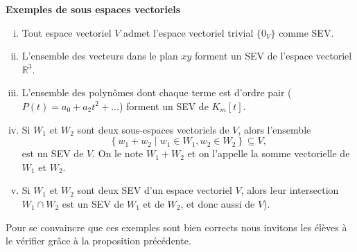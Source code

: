 \documentclass[oneside,12pt,french,table]{book}
\theoremstyle{definition}
\theoremstyle{definition}
\theoremstyle{definition}
\begin{document}
    \noindent\textbf{Exemples de sous espaces vectoriels}
        \begin{enumerate}[(i)]
            \item Tout espace vectoriel $V$ admet l'espace vectoriel trivial $\{0_V\}$ comme SEV.
            \item L'ensemble des vecteurs dans le plan $xy$ forment un SEV de l'espace vectoriel $\mathbb{R}^3$.
            \item L'ensemble des polynômes dont chaque terme est d'ordre pair ($P(t)=a_0+a_2t^2 + ...$) forment un SEV de $K_m[t]$.
            \item Si $W_{1}$ et $W_{2}$ sont deux sous-espaces vectoriels de $V$, alors l'ensemble
            $$
            \left\{w_{1}+w_{2} \mid w_{1} \in W_{1}, w_{2} \in W_{2}\right\} \subseteq V,
            $$
            est un SEV de $V$. On le note $W_{1}+W_{2}$ et on l'appelle la somme vectorielle de $W_{1}$ et $W_{2}$.
            \item Si $W_1$ et $W_2$ sont deux SEV d'un espace vectoriel $V$, alors leur intersection $W_1 \cap W_2$ est un SEV de $W_1$ et de $W_2$, et donc aussi de $V$).
        \end{enumerate}
        Pour se convaincre que ces exemples sont bien corrects nous invitons les élèves à le vérifier grâce à la proposition précédente.
\end{document}
